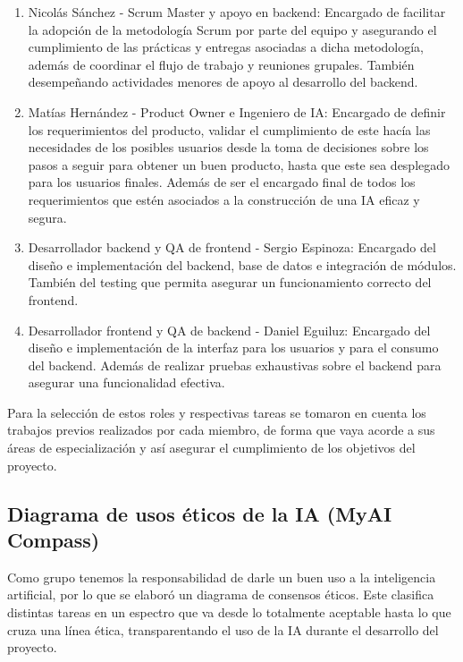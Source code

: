 \begin{enumerate}
    \item Nicolás Sánchez - Scrum Master y apoyo en backend: Encargado de facilitar la adopción de la metodología Scrum por parte del equipo y asegurando el cumplimiento de las prácticas y entregas asociadas a dicha metodología, además de coordinar el flujo de trabajo y reuniones grupales. También desempeñando actividades menores de apoyo al desarrollo del backend.
    
    \item Matías Hernández - Product Owner e Ingeniero de IA: Encargado de definir los requerimientos del producto, validar el cumplimiento de este hacía las necesidades de los posibles usuarios desde la toma de decisiones sobre los pasos a seguir para obtener un buen producto, hasta que este sea desplegado para los usuarios finales. Además de ser el encargado final de todos los requerimientos que estén asociados a la construcción de una IA eficaz y segura.
    
    \item Desarrollador backend y QA de frontend - Sergio Espinoza: Encargado del diseño e implementación del backend, base de datos e integración de módulos. También del testing que permita asegurar un funcionamiento correcto del frontend.
    
    \item Desarrollador frontend y QA de backend - Daniel Eguiluz: Encargado del diseño e implementación de la interfaz para los usuarios y para el consumo del backend. Además de realizar pruebas exhaustivas sobre el backend para asegurar una funcionalidad efectiva.
\end{enumerate}

Para la selección de estos roles y respectivas tareas se tomaron en cuenta los trabajos previos realizados por cada miembro, de forma que vaya acorde a sus áreas de especialización y así asegurar el cumplimiento de los objetivos del proyecto.

\subsection{Diagrama de usos éticos de la IA (MyAI Compass)}

Como grupo tenemos la responsabilidad de darle un buen uso a la inteligencia artificial, por lo que se elaboró un diagrama de consensos éticos. Este clasifica distintas tareas en un espectro que va desde lo totalmente aceptable hasta lo que cruza una línea ética, transparentando el uso de la IA durante el desarrollo del proyecto.

